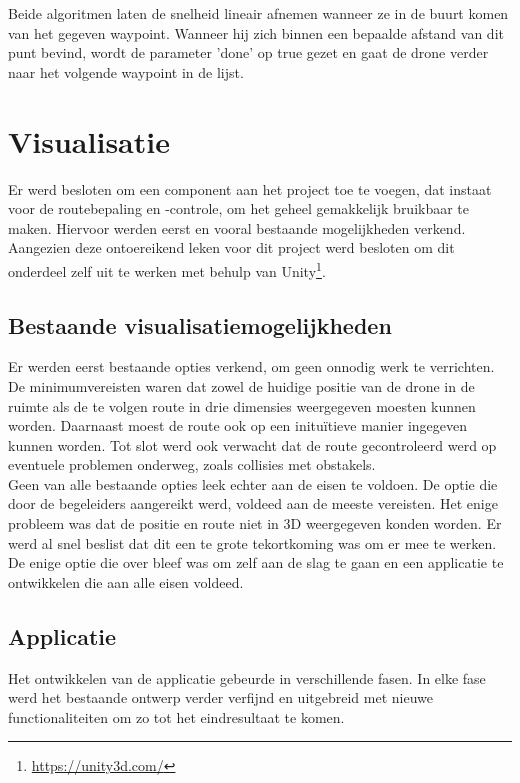 Beide algoritmen laten de snelheid lineair afnemen wanneer ze in de buurt komen van het gegeven waypoint. Wanneer hij zich binnen een bepaalde afstand van dit punt bevind, wordt de parameter 'done' op true gezet en gaat de drone verder naar het volgende waypoint in de lijst.

\section{Visualisatie} \label{sec:visualization}
Er werd besloten om een component aan het project toe te voegen, dat instaat voor de routebepaling en -controle, om het geheel gemakkelijk bruikbaar te maken.
Hiervoor werden eerst en vooral bestaande mogelijkheden verkend.
Aangezien deze ontoereikend leken voor dit project werd besloten om dit onderdeel zelf uit te werken met behulp van Unity\footnote{\url{https://unity3d.com/}}.

\subsection{Bestaande visualisatiemogelijkheden} \label{sec:opties}
Er werden eerst bestaande opties verkend, om geen onnodig werk te verrichten. De minimumvereisten waren dat zowel de huidige positie van de drone in de ruimte als de te volgen route in drie dimensies weergegeven moesten kunnen worden. Daarnaast moest de route ook op een initu\"itieve manier ingegeven kunnen worden. Tot slot werd ook verwacht dat de route gecontroleerd werd op eventuele problemen onderweg, zoals collisies met obstakels.\\

Geen van alle bestaande opties leek echter aan de eisen te voldoen. De optie die door de begeleiders aangereikt werd, voldeed aan de meeste vereisten. Het enige probleem was dat de positie en route niet in 3D weergegeven konden worden. Er werd al snel beslist dat dit een te grote tekortkoming was om er mee te werken. De enige optie die over bleef was om zelf aan de slag te gaan en een applicatie te ontwikkelen die aan alle eisen voldeed.

\subsection{Applicatie} \label{sec:unity}
Het ontwikkelen van de applicatie gebeurde in verschillende fasen. In elke fase werd het bestaande ontwerp verder verfijnd en uitgebreid met nieuwe functionaliteiten om zo tot het eindresultaat te komen.\\

